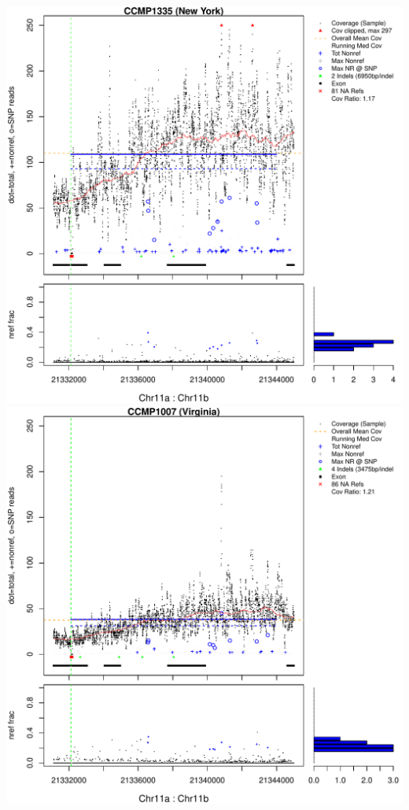 \documentclass{article}\usepackage[]{graphicx}\usepackage[]{color}
\makeatletter
\def\maxwidth{ %
  \ifdim\Gin@nat@width>\linewidth
    \linewidth
  \else
    \Gin@nat@width
  \fi
}
\newenvironment{knitrout}{}{} %
\makeatother
\begin{document}
\begin{knitrout}
{\centering \includegraphics[width=\maxwidth]{figs-knitr/unnamed-chunk-52-1} 
\includegraphics[width=\maxwidth]{figs-knitr/unnamed-chunk-52-2} 
}
\end{knitrout}
\end{document}
